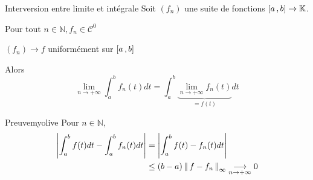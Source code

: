     \begin{prop}{Interversion entre limite et intégrale}{}
        Soit $(f_n)$ une suite de fonctions $\left[ a \, , b \right] \rightarrow \mathbb{K}$. 
        \begin{suppose}
            \item Pour tout $n \in \mathbb{N}, f_n \in \mathcal{C}^0$
            \item $(f_n) \rightarrow f$ uniformément sur $\left[ a \, , b \right]$
        \end{suppose}
        Alors \[ \lim_{n \rightarrow +\infty} \int_{a}^{b} f_n(t)dt = \int_{a}^{b} \underbrace{\lim_{n \rightarrow +\infty} f_n(t)}_{= f(t)} dt \] 
    \end{prop}

    \begin{demo}{Preuve}{myolive}
        Pour $n \in \mathbb{N}$, 
        \begin{align*}
            \left\lvert \int_{a}^{b} f(t)dt - \int_{a}^{b} f_n(t)dt\right\rvert 
            &= \left\lvert \int_{a}^{b} f(t) - f_n(t) dt \right\rvert \\
            &\leq (b-a) \left\lVert\,f - f_n\,\right\rVert_{\infty} \underset{n \rightarrow +\infty}{\longrightarrow} 0
        \end{align*}
    \end{demo}

